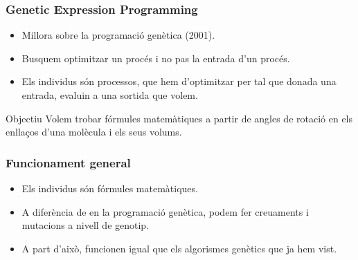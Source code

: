 \documentclass{beamer}
\begin{document}

\begin{frame}
	\frametitle{Genetic Expression Programming}
	\begin{center}
	\end{center}
	\begin{itemize}
		\item Millora sobre la programació genètica (2001).
		\item Busquem optimitzar un procés i no pas la entrada d'un procés.
		\item Els individus són processos, que hem d'optimitzar per tal que donada una entrada,
			evaluin a una sortida que volem.
	\end{itemize}
	\pause
	\begin{block}{Objectiu}
		Volem trobar fórmules matemàtiques a partir de angles de rotació en els
		enllaços d'una molècula i els seus volums.
	\end{block}
\end{frame}

\begin{frame}
	\frametitle{Funcionament general}
	\begin{itemize}
		\item Els individus són fórmules matemàtiques.
		\item A diferència de en la programació genètica, podem fer creuaments i
		mutacions a nivell de genotip.
		\item A part d'això, funcionen igual que els algorismes genètics que ja
		hem vist.
	\end{itemize}
\end{frame}
\end{document}
